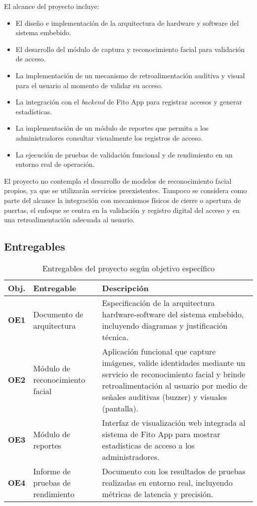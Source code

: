 El alcance del proyecto incluye:
\begin{itemize}
    \item El diseño e implementación de la arquitectura de hardware y software del sistema embebido.
    \item El desarrollo del módulo de captura y reconocimiento facial para validación de acceso.
    \item La implementación de un mecanismo de retroalimentación auditiva y visual para el usuario al momento de validar su acceso.
    \item La integración con el \textit{backend} de Fito App para registrar accesos y generar estadísticas.
    \item La implementación de un módulo de reportes que permita a los administradores consultar visualmente los registros de acceso.
    \item La ejecución de pruebas de validación funcional y de rendimiento en un entorno real de operación.
\end{itemize}

El proyecto no contempla el desarrollo de modelos de reconocimiento facial propios, ya que se utilizarán servicios preexistentes. Tampoco se considera como parte del alcance la integración con mecanismos físicos de cierre o apertura de puertas, el enfoque se centra en la validación y registro digital del acceso y en una retroalimentación adecuada al usuario.

\subsection{Entregables}

\begin{table}[h!]
    \centering
    \begin{tabular}{p{1.5cm}|p{4.5cm}|p{8cm}}
    \hline
    \textbf{Obj.} & \textbf{Entregable} & \textbf{Descripción} \\ \hline
    \textbf{OE1} & Documento de arquitectura & Especificación de la arquitectura hardware-software del sistema embebido, incluyendo diagramas y justificación técnica. \\ \hline
    \textbf{OE2} & Módulo de reconocimiento facial & Aplicación funcional que capture imágenes, valide identidades mediante un servicio de reconocimiento facial y brinde retroalimentación al usuario por medio de señales auditivas (buzzer) y visuales (pantalla). \\ \hline
    \textbf{OE3} & Módulo de reportes & Interfaz de visualización web integrada al sistema de Fito App para mostrar estadísticas de acceso a los administradores. \\ \hline
    \textbf{OE4} & Informe de pruebas de rendimiento & Documento con los resultados de pruebas realizadas en entorno real, incluyendo métricas de latencia y precisión. \\ \hline
    \end{tabular}
    \caption{Entregables del proyecto según objetivo específico}
\end{table}
    

